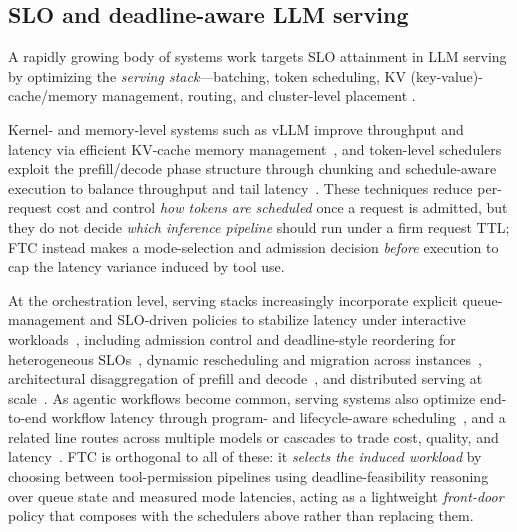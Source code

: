 \documentclass[fleqn,12pt,lineno]{wlpeerj}
\begin{document}
\subsection{SLO and deadline-aware LLM serving}
A rapidly growing body of systems work targets SLO attainment in LLM serving by optimizing the \emph{serving stack}---batching, token scheduling, KV (key-value)-cache/memory management, routing, and cluster-level placement \cite{agentxpu2025}.

Kernel- and memory-level systems such as vLLM improve throughput and latency via efficient KV-cache memory management~\cite{kwon2023pagedattention}, and token-level schedulers exploit the prefill/decode phase structure through chunking and schedule-aware execution to balance throughput and tail latency~\cite{agrawal2024sarathiserve}. These techniques reduce per-request cost and control \emph{how tokens are scheduled} once a request is admitted, but they do not decide \emph{which inference pipeline} should run under a firm request TTL; FTC instead makes a mode-selection and admission decision \emph{before} execution to cap the latency variance induced by tool use.

At the orchestration level, serving stacks increasingly incorporate explicit queue-management and SLO-driven policies to stabilize latency under interactive workloads~\cite{patke2024qlm,hong2025sola,chen2025slosserve, jitserve2025}, including admission control and deadline-style reordering for heterogeneous SLOs~\cite{tang2025scorpio,zhong2024distserve}, dynamic rescheduling and migration across instances~\cite{sun2024llumnix}, architectural disaggregation of prefill and decode~\cite{zhong2024distserve}, and distributed serving at scale~\cite{wu2023fastserve}. As agentic workflows become common, serving systems also optimize end-to-end workflow latency through program- and lifecycle-aware scheduling~\cite{285173,autellix2025,astraea2025,augserve2025}, and a related line routes across multiple models or cascades to trade cost, quality, and latency~\cite{chen2023frugalgpt,ong2024routellm,wang2025mixllm}. FTC is orthogonal to all of these: it \emph{selects the induced workload} by choosing between tool-permission pipelines using deadline-feasibility reasoning over queue state and measured mode latencies, acting as a lightweight \emph{front-door} policy that composes with the schedulers above rather than replacing them.
\end{document}

